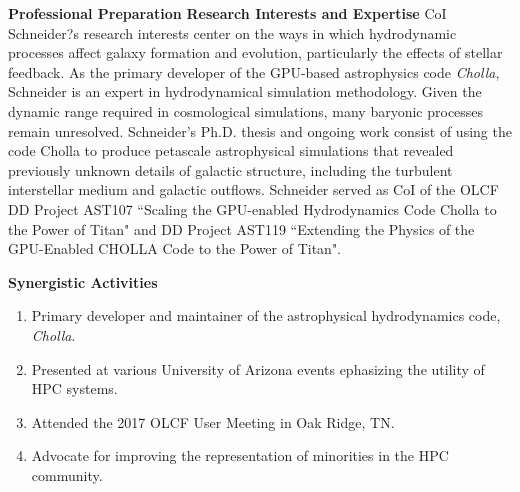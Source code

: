 \documentclass[11pt,letterpaper,english]{article}
\begin{document}
\begin{flushleft} {\bf Professional Preparation}
\vspace{-6pt}
{\bf Research Interests and Expertise}
{\parindent 16pt
CoI Schneider?s research interests center on the ways in which hydrodynamic processes affect galaxy formation and evolution, particularly the effects of stellar feedback. As the primary developer of the GPU-based astrophysics code \textit{Cholla}, Schneider is an expert in hydrodynamical simulation methodology. Given the dynamic range required in cosmological simulations, many baryonic processes remain unresolved. Schneider's Ph.D. thesis and ongoing work consist of using the code Cholla to produce petascale astrophysical simulations that revealed previously unknown details of galactic structure, including the turbulent interstellar medium and galactic outflows. Schneider served as CoI of the OLCF DD Project AST107 ``Scaling the GPU-enabled Hydrodynamics Code Cholla to the Power of Titan" and DD Project AST119 ``Extending the Physics of the GPU-Enabled CHOLLA Code to the Power of Titan".
}

\vspace{.04in}
{\bf Synergistic Activities}
\vspace{-6pt}
\begin{enumerate} \itemsep1pt \parskip0pt 
\item Primary developer and maintainer of the astrophysical hydrodynamics code, \textit{Cholla}. \\ 
\item Presented at various University of Arizona events ephasizing the utility of HPC systems. \\ 
\item Attended the 2017 OLCF User Meeting in Oak Ridge, TN. \\ 
\item Advocate for improving the representation of minorities in the HPC community. \\
\end{enumerate} 


\end{flushleft}
\end{document}
